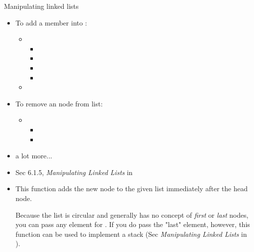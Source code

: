 \begin{frame}
  \begin{block}{Manipulating linked lists}
    \begin{itemize}
    \item To add a  member into :
      \begin{itemize}
      \item[] 
        \begin{itemize}
        \item {}
        \item {}
        \item {}
        \item {}
        \end{itemize}
      \item[] 
      \end{itemize}
    \item To remove an  node from list:
      \begin{itemize}
      \item[] 
        \begin{itemize}
        \item {}
        \item {}
        \end{itemize}
      \end{itemize}
    \item a lot more...
    \end{itemize}
  \end{block}
\end{frame}

\begin{itemize}
\item Sec 6.1.5, \emph{Manipulating Linked Lists} in \cite{love2010linux}
\item This function adds the new node to the given list immediately after the head node.
  \begin{center}
  \end{center}
  Because the list is circular and generally has no concept of \emph{first} or
  \emph{last} nodes, you can pass any element for . If you do pass the "last" element,
  however, this function can be used to implement a stack (Sec \emph{Manipulating Linked
    Lists} in \cite{love2010linux}).
\end{itemize}

